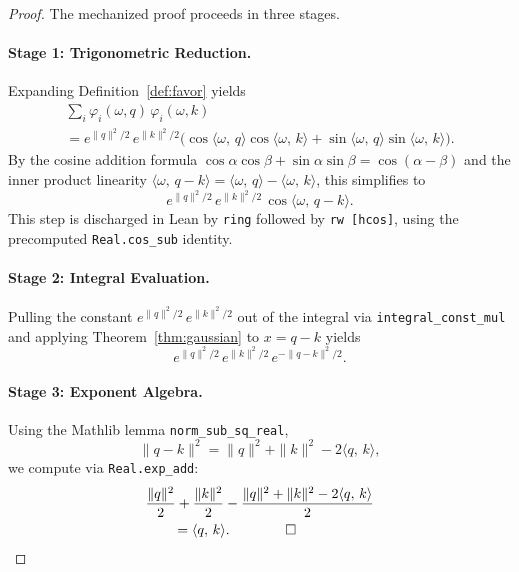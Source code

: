\documentclass[11pt,a4paper,twocolumn]{article}
\theoremstyle{definition}
\theoremstyle{remark}
\newcommand{\ip}[2]{\langle #1,\, #2 \rangle}
\newcommand{\leancode}[1]{\texttt{\color{leanblue}#1}}
\begin{document}
\begin{proof}
The mechanized proof proceeds in three stages.

\paragraph{Stage 1: Trigonometric Reduction.}
Expanding Definition~\ref{def:favor} yields
\begin{multline}
  \sum_{i} \varphi_i(\omega,q)\,\varphi_i(\omega,k) \\
  = e^{\|q\|^2\!/2}\,e^{\|k\|^2\!/2}
    \bigl(\cos\ip{\omega}{q}\cos\ip{\omega}{k}
    + \sin\ip{\omega}{q}\sin\ip{\omega}{k}\bigr).
\end{multline}
By the cosine addition formula
$\cos\alpha\cos\beta + \sin\alpha\sin\beta = \cos(\alpha - \beta)$
and the inner product linearity
$\ip{\omega}{q-k} = \ip{\omega}{q} - \ip{\omega}{k}$, this simplifies to
\begin{equation}
  e^{\|q\|^2\!/2}\,e^{\|k\|^2\!/2}\,\cos\ip{\omega}{q-k}.
\end{equation}
This step is discharged in Lean by \texttt{ring} followed by
\texttt{rw~[hcos]}, using the precomputed
\leancode{Real.cos\_sub} identity.

\paragraph{Stage 2: Integral Evaluation.}
Pulling the constant $e^{\|q\|^2\!/2}\,e^{\|k\|^2\!/2}$ out of the integral
via \leancode{integral\_const\_mul} and applying
Theorem~\ref{thm:gaussian} to $x = q - k$ yields
\begin{equation}
  e^{\|q\|^2\!/2}\,e^{\|k\|^2\!/2}\,e^{-\|q-k\|^2\!/2}.
\end{equation}

\paragraph{Stage 3: Exponent Algebra.}
Using the Mathlib lemma \leancode{norm\_sub\_sq\_real},
\begin{equation}
  \|q - k\|^2 = \|q\|^2 + \|k\|^2 - 2\ip{q}{k},
\end{equation}
we compute via \leancode{Real.exp\_add}:
\begin{align}
  &\frac{\|q\|^2}{2} + \frac{\|k\|^2}{2}
    - \frac{\|q\|^2 + \|k\|^2 - 2\ip{q}{k}}{2} \notag\\
  &\qquad = \ip{q}{k}. \qquad\qed
\end{align}
\end{proof}
\end{document}
